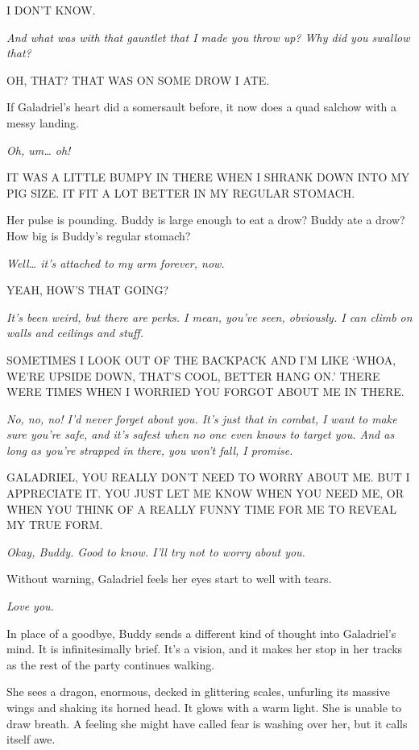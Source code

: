 \documentclass[smalldemyvopaper,11pt,twoside,onecolumn,openright,extrafontsizes]{memoir}
\begin{document}
I DON'T KNOW.

\emph{And what was with that gauntlet that I made you throw up? Why did
you swallow that?}

OH, THAT? THAT WAS ON SOME DROW I ATE.

If Galadriel's heart did a somersault before, it now does a quad salchow
with a messy landing.

\emph{Oh, um\ldots{} oh!}

IT WAS A LITTLE BUMPY IN THERE WHEN I SHRANK DOWN INTO MY PIG SIZE. IT
FIT A LOT BETTER IN MY REGULAR STOMACH.

Her pulse is pounding. Buddy is large enough to eat a drow? Buddy ate a
drow? How big is Buddy's regular stomach?

\emph{Well\ldots{} it's attached to my arm forever, now.}

YEAH, HOW'S THAT GOING?

\emph{It's been weird, but there are perks. I mean, you've seen,
obviously. I can climb on walls and ceilings and stuff.}

SOMETIMES I LOOK OUT OF THE BACKPACK AND I'M LIKE `WHOA, WE'RE UPSIDE
DOWN, THAT'S COOL, BETTER HANG ON.' THERE WERE TIMES WHEN I WORRIED YOU
FORGOT ABOUT ME IN THERE.

\emph{No, no, no! I'd never forget about you. It's just that in combat,
I want to make sure you're safe, and it's safest when no one even knows
to target you. And as long as you're strapped in there, you won't fall,
I promise.}

GALADRIEL, YOU REALLY DON'T NEED TO WORRY ABOUT ME. BUT I APPRECIATE IT.
YOU JUST LET ME KNOW WHEN YOU NEED ME, OR WHEN YOU THINK OF A REALLY
FUNNY TIME FOR ME TO REVEAL MY TRUE FORM.

\emph{Okay, Buddy. Good to know. I'll try not to worry about you.}

Without warning, Galadriel feels her eyes start to well with tears.

\emph{Love you.}

In place of a goodbye, Buddy sends a different kind of thought into
Galadriel's mind. It is infinitesimally brief. It's a vision, and it
makes her stop in her tracks as the rest of the party continues walking.

She sees a dragon, enormous, decked in glittering scales, unfurling its
massive wings and shaking its horned head. It glows with a warm light.
She is unable to draw breath. A feeling she might have called fear is
washing over her, but it calls itself awe.
\end{document}

